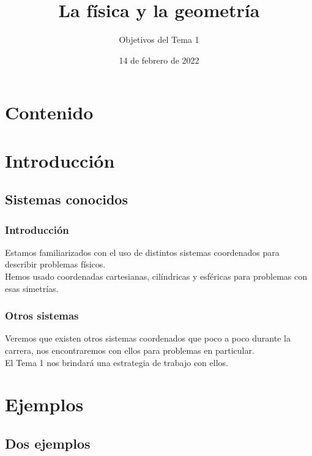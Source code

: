 \documentclass[12pt]{beamer}
\date{14 de febrero de 2022}
\title{La física y la geometría}
\subtitle{Objetivos del Tema 1}
\begin{document}
\maketitle
\fontsize{14}{14}\selectfont
{}

\section*{Contenido}


\section{Introducción}
\subsection{Sistemas conocidos}

\begin{frame}
\frametitle{Introducción}
Estamos familiarizados con el uso de distintos sistemas coordenados para describir problemas físicos.
\\
\bigskip
\pause
Hemos usado coordenadas cartesianas, cilíndricas y esféricas para problemas con esas simetrías.
\end{frame}
\begin{frame}
\frametitle{Otros sistemas}
Veremos que existen otros sistemas coordenados que poco a poco durante la carrera, nos encontraremos con ellos para problemas en particular.
\\
\bigskip
\pause
El Tema 1 nos brindará una estrategia de trabajo con ellos.
\end{frame}

\section{Ejemplos}
\subsection{Dos ejemplos}
\end{document}
